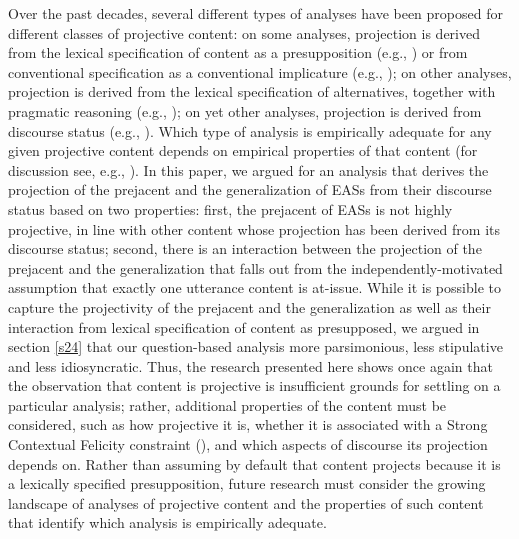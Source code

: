 \documentclass[11pt,fleqn]{article}
\newcommand{\6}{\mbox{$[\hspace*{-.6mm}[$}}
\newcommand{\9}{\mbox{$]\hspace*{-.6mm}]$}}
\begin{document}
Over the past decades, several different types of analyses have been proposed for different classes of projective content: on some analyses, projection is derived from the lexical specification of content as a presupposition (e.g., \citealt{heim83,vds92}) or from conventional specification as a conventional implicature (e.g., \citealt{potts05,murray2014}); on other analyses, projection is derived from the lexical specification of alternatives, together with pragmatic reasoning (e.g., \citealt{abusch02,abusch10,romoli2015}); on yet other analyses, projection is derived from discourse status (e.g., \citealt{abrusan2011,abrusan2013,abrusan2016,brst-salt10,best-question,brst-ar}). Which type of analysis is empirically adequate for any given projective content depends on empirical properties of that content (for discussion see, e.g., \citealt{kadmon01,potts05,brst-lang11,tbd-variability,tonhauser-etal-sub23}). In this paper, we argued for an analysis that derives the projection of the prejacent and the generalization of EASs from their discourse status based on two properties: first, the prejacent of EASs is not highly projective, in line with other content whose projection has been derived from its discourse status; second, there is an interaction between the projection of the prejacent and the generalization that falls out from the independently-motivated assumption that exactly one utterance content is at-issue. While it is possible to capture the projectivity of the prejacent and the generalization as well as their interaction from  lexical specification of content as presupposed, we argued in section \ref{s24} that our question-based analysis more parsimonious, less stipulative and less idiosyncratic. Thus, the research presented here shows once again that the observation that content is projective is insufficient grounds for settling on a particular analysis; rather, additional properties of the content must be considered, such as how projective it is, whether it is associated with a Strong Contextual Felicity constraint (\citealt{brst-lang11}), and which aspects of discourse its projection depends on. Rather than assuming by default that content projects because it is a lexically specified presupposition, future research must consider the growing landscape of analyses of projective content and the properties of such content that identify which analysis is empirically adequate.
\end{document}
